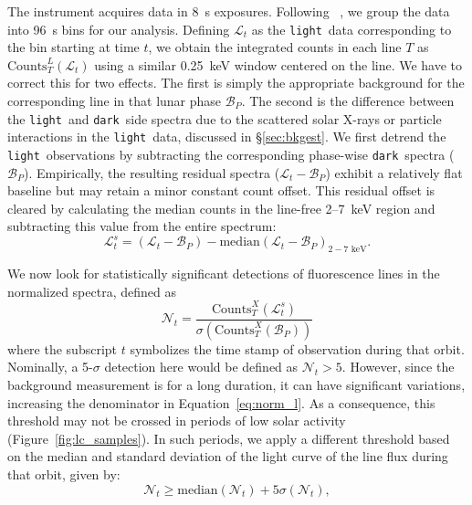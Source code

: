 \documentclass[twocolumn,linenumbers]{aastex631}
\newcommand{\dark}{\texttt{dark}~}
\newcommand{\light}{\texttt{light}~}
\newcommand{\revone}[1]{#1}
\begin{document}
The instrument acquires data in 8~s exposures. Following ~\citet{NARENDRANATH2024115898}, we group the data into 96~s bins for our analysis. Defining $\mathcal{L}_t$ as the \light data corresponding to the bin starting at time $t$, we obtain the integrated counts in each line $T$ as $\text{Counts}^L_T\left(\mathcal{L}_t\right)$ using a similar 0.25~keV window centered on the line. We have to correct this for two effects. The first is simply the appropriate background for the corresponding line in that lunar phase $\mathcal{B}_P$. The second is the difference between the \light and \dark side spectra due to the scattered solar X-rays or particle interactions in the \light data, discussed in \S\ref{sec:bkgest}. \revone{We first detrend the \light observations by subtracting the corresponding phase-wise \dark spectra ($\mathcal{B}_P$). Empirically, the resulting residual spectra ($\mathcal{L}_t - \mathcal{B}_P$) exhibit a relatively flat baseline but may retain a minor constant count offset. This residual offset is cleared by calculating the median counts in the line-free 2--7~keV region and subtracting this value from the entire spectrum:}
\begin{equation}
\mathcal{L}^s_t = \left(\mathcal{L}_t - \mathcal{B}_P\right) - \mathrm{median}\left(\mathcal{L}_t - \mathcal{B}_P\right)_{2-7\text{~keV}}.
\end{equation}


We now look for statistically significant detections of fluorescence lines in the normalized spectra, defined as
\begin{equation}
    \mathcal{N}_t = \frac{\text{Counts}^X_T(\mathcal L^s_t)}{\sigma\left(\text{Counts}_T^X\left(\mathcal{B}_P\right)\right)} \label{eq:norm_l}
\end{equation}
where the subscript $t$ symbolizes the time stamp of observation during that orbit.
Nominally, a 5-$\sigma$ detection here would be defined as $\mathcal{N}_t > 5$. However, since the background measurement is for a long duration, it can have significant variations, increasing the denominator in Equation~\ref{eq:norm_l}. As a consequence, this threshold may not be crossed in periods of low solar activity \revone{(Figure~\ref{fig:lc_samples})}. In such periods, we apply a different threshold based on the median and standard deviation of the light curve of the line flux during that orbit, given by:
\begin{equation}
   \mathcal{N}_t \geq \text{median}(\mathcal{N}_t) + 5 \sigma(\mathcal{N}_t),
    \label{eq:detection-criteria1}
\end{equation}
\end{document}

